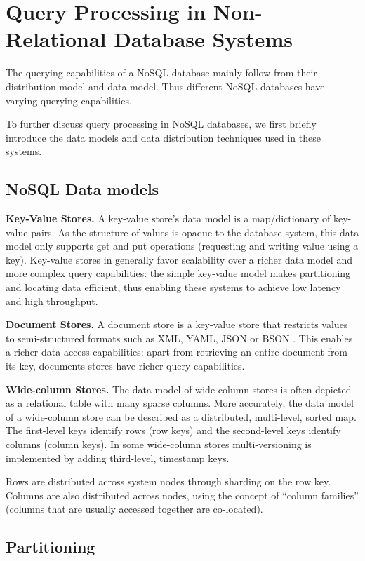 \section{Query Processing in Non-Relational Database Systems}

The querying capabilities of a NoSQL database mainly follow from their distribution model and data model.
Thus different NoSQL databases have varying querying capabilities.

To further discuss query processing in NoSQL databases, we first briefly introduce the data models and data distribution
techniques used in these systems.

\subsection{NoSQL Data models}
\noindent
\textbf{Key-Value Stores.} A key-value store's data model is a map/dictionary of key-value pairs.
As the structure of values is opaque to the database system, this data model only supports get and put operations
(requesting and writing value using a key).
Key-value stores in generally favor scalability over a richer data model and more complex query capabilities:
the simple key-value model makes partitioning and locating data efficient, thus enabling these systems to achieve low
latency and high throughput.

\bigskip
\noindent
\textbf{Document Stores.} A document store is a key-value store that restricts values to semi-structured formats such as
XML, YAML, JSON or BSON \cite{bson:spec}.
This enables a richer data access capabilities: apart from retrieving an entire document from its key, documents stores
have richer query capabilities.

\bigskip
\noindent
\textbf{Wide-column Stores.} The data model of wide-column stores is often depicted as a relational table with many
sparse columns.
More accurately, the data model of a wide-column store can be described as a distributed, multi-level, sorted map.
The first-level keys identify rows (row keys) and the second-level keys identify columns (column keys).
In some wide-column stores multi-versioning is implemented by adding third-level, timestamp keys.

Rows are distributed across system nodes through sharding on the row key.
Columns are also distributed across nodes, using the concept of ``column families'' (columns that are usually accessed
together are co-located).

\subsection{Partitioning}
\label{sec:partitioning}

